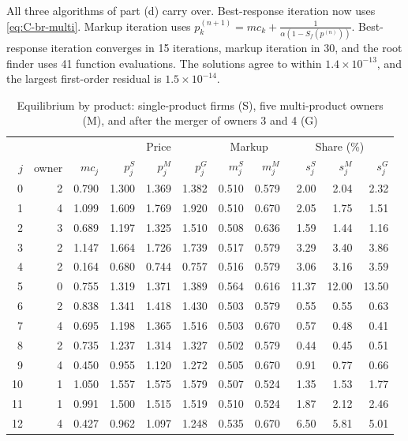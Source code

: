 All three algorithms of part (d) carry over. Best-response iteration now uses \eqref{eq:C-br-multi}. Markup
iteration uses $p^{(n+1)}_k = mc_k + \frac{1}{\alpha(1 - S_f(p^{(n)}))}$. Best-response iteration converges in 15
iterations, markup iteration in 30, and the root finder uses 41 function evaluations. The solutions agree to within
$1.4\times10^{-13}$, and the largest first-order residual is $1.5\times10^{-14}$.

\begin{table}[htbp]
\centering
\caption{Equilibrium by product: single-product firms (S), five multi-product owners (M), and after the merger of
owners 3 and 4 (G)}
\label{tab:C-logit-eq}
\footnotesize
\setlength{\tabcolsep}{5pt}
\begin{tabular}{@{}rrrrrrrrrrr@{}}
\toprule
 & & & \multicolumn{3}{c}{Price} & \multicolumn{2}{c}{Markup} & \multicolumn{3}{c}{Share (\%)} \\
\cmidrule(lr){4-6}\cmidrule(lr){7-8}\cmidrule(l){9-11}
$j$ & owner & $mc_j$ & $p_j^S$ & $p_j^M$ & $p_j^G$ & $m_j^S$ & $m_j^M$ & $s_j^S$ & $s_j^M$ & $s_j^G$ \\
\midrule
0 & 2 & 0.790 & 1.300 & 1.369 & 1.382 & 0.510 & 0.579 & 2.00 & 2.04 & 2.32 \\
1 & 4 & 1.099 & 1.609 & 1.769 & 1.920 & 0.510 & 0.670 & 2.05 & 1.75 & 1.51 \\
2 & 3 & 0.689 & 1.197 & 1.325 & 1.510 & 0.508 & 0.636 & 1.59 & 1.44 & 1.16 \\
3 & 2 & 1.147 & 1.664 & 1.726 & 1.739 & 0.517 & 0.579 & 3.29 & 3.40 & 3.86 \\
4 & 2 & 0.164 & 0.680 & 0.744 & 0.757 & 0.516 & 0.579 & 3.06 & 3.16 & 3.59 \\
5 & 0 & 0.755 & 1.319 & 1.371 & 1.389 & 0.564 & 0.616 & 11.37 & 12.00 & 13.50 \\
6 & 2 & 0.838 & 1.341 & 1.418 & 1.430 & 0.503 & 0.579 & 0.55 & 0.55 & 0.63 \\
7 & 4 & 0.695 & 1.198 & 1.365 & 1.516 & 0.503 & 0.670 & 0.57 & 0.48 & 0.41 \\
8 & 2 & 0.735 & 1.237 & 1.314 & 1.327 & 0.502 & 0.579 & 0.44 & 0.45 & 0.51 \\
9 & 4 & 0.450 & 0.955 & 1.120 & 1.272 & 0.505 & 0.670 & 0.91 & 0.77 & 0.66 \\
10 & 1 & 1.050 & 1.557 & 1.575 & 1.579 & 0.507 & 0.524 & 1.35 & 1.53 & 1.77 \\
11 & 1 & 0.991 & 1.500 & 1.515 & 1.519 & 0.510 & 0.524 & 1.87 & 2.12 & 2.46 \\
12 & 4 & 0.427 & 0.962 & 1.097 & 1.248 & 0.535 & 0.670 & 6.50 & 5.81 & 5.01 \\

\end{tabular}
\end{table}
